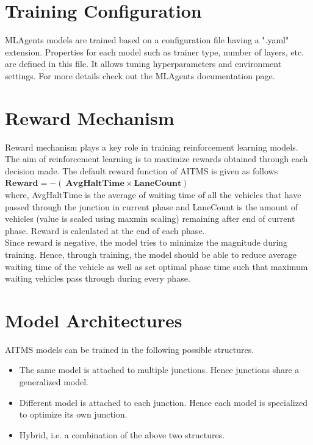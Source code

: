 \documentclass[openany,12pt]{report}
\begin{document}
		\section{Training Configuration}
		\hspace*{0.5 in}MLAgents models are trained based on a configuration file having a ".yaml" extension. Properties for each model such as trainer type, number of layers, etc. are defined in this file. 
		It allows tuning hyperparameters and environment settings. For more details check out the MLAgents documentation page.
		
		\newpage
		\section{Reward Mechanism}
		\hspace*{0.5 in}Reward mechanism plays a key role in training reinforcement learning models. The aim of reinforcement learning is to maximize rewards obtained through each decision made. The default reward function of AITMS is given as follows\\ 
		\hspace*{1 in}$\mathbf{Reward = - (\ AvgHaltTime \times LaneCount )\ }$\\
		where, AvgHaltTime is the average of waiting time of all the vehicles that have passed through the junction in current phase and LaneCount is the amount of vehicles (value is scaled using maxmin scaling) remaining after end of current phase. Reward is calculated at the end of each phase.\\
		\hspace*{0.5 in} Since reward is negative, the model tries to minimize the magnitude during training. Hence, through training, the model should be able to reduce average waiting time of the vehicle as well as set optimal phase time such that maximum waiting vehicles pass through during every phase.\\
		
		\section{Model Architectures}
		\hspace*{0.5 in} AITMS models can be trained in the following possible structures.
		\begin{itemize}
			\item{The same model is attached to multiple junctions. Hence junctions share a generalized model.}
			\item{Different model is attached to each junction. Hence each model is specialized to optimize its own junction.}
			\item{Hybrid, i.e. a combination of the above two structures.}
		\end{itemize}
		
\end{document}

